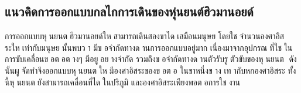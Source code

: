 \subsection{แนวคิดการออกแบบกลไกการเดินของหุ่นยนต์ฮิวมานอยด์}
การออกแบบหุนยนตฮิวมานอยด์ใหสามารถเดินสองขาไดเสมือนมนุษยโดยใชจํานวนองศาอิสระใหเท่ากับมนุษยนั้นพบวา
มีขอจํากัดทางดานการออกแบบอยู่มาก เนื่องมาจากอุปกรณที่ใชในการขับเคลื่อนขอตอตางๆ มีอยูอยางจํากัด
รวมถึงขอจํากัดทางดานตัวรับรูตัวขับของหุนยนต ดังนั้นผูจัดทําจึงออกแบบหุนยนตใหมีองศาอิสระของขอตอ ในขาหนึ่งขาง
เทากับหกองศาอิสระ ทั้งนี้หุนยนตยังสามารถเคลื่อนที่ไดในปริภูมิ และองศาอิสระเพียงพอตอการใชงาน